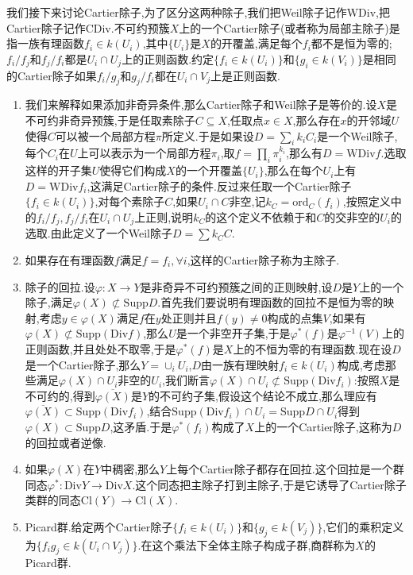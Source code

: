 我们接下来讨论Cartier除子,为了区分这两种除子,我们把Weil除子记作$\mathrm{WDiv}$,把Cartier除子记作$\mathrm{CDiv}$.不可约预簇$X$上的一个Cartier除子(或者称为局部主除子)是指一族有理函数$f_i\in k(U_i)$,其中$\{U_i\}$是$X$的开覆盖,满足每个$f_i$都不是恒为零的;$f_i/f_j$和$f_j/f_i$都是$U_i\cap U_j$上的正则函数.约定$\{f_i\in k(U_i)\}$和$\{g_i\in k(V_i)\}$是相同的Cartier除子如果$f_i/g_j$和$g_j/f_i$都在$U_i\cap V_j$上是正则函数.
\begin{enumerate}
	\item 我们来解释如果添加非奇异条件,那么Cartier除子和Weil除子是等价的.设$X$是不可约非奇异预簇,于是任取素除子$C\subseteq X$,任取点$x\in X$,那么存在$x$的开邻域$U$使得$C$可以被一个局部方程$\pi$所定义.于是如果设$D=\sum_ik_iC_i$是一个Weil除子,每个$C_i$在$U$上可以表示为一个局部方程$\pi_i$,取$f=\prod_i\pi_i^{k_i}$,那么有$D=\mathrm{WDiv}f$.选取这样的开子集$U$使得它们构成$X$的一个开覆盖$\{U_i\}$,那么在每个$U_i$上有$D=\mathrm{WDiv}f_i$,这满足Cartier除子的条件.反过来任取一个Cartier除子$\{f_i\in k(U_i)\}$,对每个素除子$C$,如果$U_i\cap C$非空,记$k_C=\mathrm{ord}_C(f_i)$,按照定义中的$f_i/f_j,f_j/f_i$在$U_i\cap U_j$上正则,说明$k_C$的这个定义不依赖于和$C$的交非空的$U_i$的选取.由此定义了一个Weil除子$D=\sum k_CC$.
	\item 如果存在有理函数$f$满足$f=f_i,\forall i$,这样的Cartier除子称为主除子.
	\item 除子的回拉.设$\varphi:X\to Y$是非奇异不可约预簇之间的正则映射,设$D$是$Y$上的一个除子,满足$\varphi(X)\not\subset\mathrm{Supp}D$.首先我们要说明有理函数的回拉不是恒为零的映射,考虑$y\in\varphi(X)$满足$f$在$y$处正则并且$f(y)\not=0$构成的点集$V$,如果有$\varphi(X)\not\subset\mathrm{Supp}(\mathrm{Div}f)$,那么$U$是一个非空开子集,于是$\varphi^*(f)$是$\varphi^{-1}(V)$上的正则函数,并且处处不取零,于是$\varphi^*(f)$是$X$上的不恒为零的有理函数.现在设$D$是一个Cartier除子,那么$Y=\cup_iU_i$,$D$由一族有理映射$f_i\in k(U_i)$构成,考虑那些满足$\varphi(X)\cap U_i$非空的$U_i$,我们断言$\varphi(X)\cap U_i\not\subset\mathrm{Supp}(\mathrm{Div}f_i)$:按照$X$是不可约的,得到$\overline{\varphi(X)}$是$Y$的不可约子集,假设这个结论不成立,那么理应有$\overline{\varphi(X)}\subset\mathrm{Supp}(\mathrm{Div}f_i)$,结合$\mathrm{Supp}(\mathrm{Div}f_i)\cap U_i=\mathrm{Supp}D\cap U_i$得到$\varphi(X)\subset\mathrm{Supp}D$,这矛盾.于是$\varphi^*(f_i)$构成了$X$上的一个Cartier除子,这称为$D$的回拉或者逆像.
	\item 如果$\varphi(X)$在$Y$中稠密,那么$Y$上每个Cartier除子都存在回拉.这个回拉是一个群同态$\varphi^*:\mathrm{Div}Y\to\mathrm{Div}X$.这个同态把主除子打到主除子,于是它诱导了Cartier除子类群的同态$\mathrm{Cl}(Y)\to\mathrm{Cl}(X)$.
	\item Picard群.给定两个Cartier除子$\{f_i\in k(U_i)\}$和$\{g_j\in k(V_j)\}$,它们的乘积定义为$\{f_ig_j\in k(U_i\cap V_j)\}$.在这个乘法下全体主除子构成子群,商群称为$X$的Picard群.
\end{enumerate}

